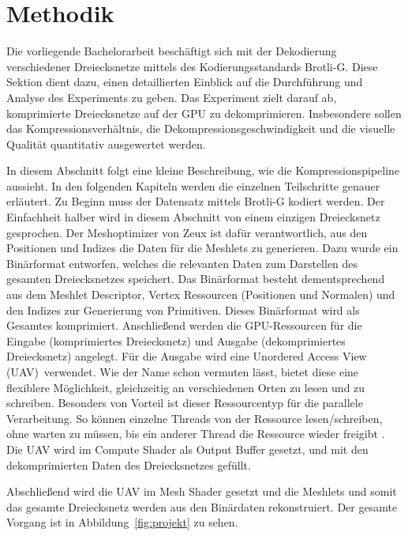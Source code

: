 \section{Methodik}
\label{sec:methodik}
Die vorliegende Bachelorarbeit beschäftigt sich mit der Dekodierung verschiedener Dreiecksnetze mittels des Kodierungsstandards Brotli-G.
Diese Sektion dient dazu, einen detaillierten Einblick auf die Durchführung und Analyse des Experiments zu geben.
Das Experiment zielt darauf ab, komprimierte Dreiecksnetze auf der GPU zu dekomprimieren.
Insbesondere sollen das Kompressionsverhältnis, die Dekompressionsgeschwindigkeit und die visuelle Qualität quantitativ ausgewertet werden. \newline

In diesem Abschnitt folgt eine kleine Beschreibung, wie die Kompressionspipeline aussieht.
In den folgenden Kapiteln werden die einzelnen Teilschritte genauer erläutert. \newline
Zu Beginn muss der Datensatz mittels Brotli-G kodiert werden.
Der Einfachheit halber wird in diesem Abschnitt von einem einzigen Dreiecksnetz gesprochen.
Der Meshoptimizer von Zeux \cite{Zeux} ist dafür verantwortlich, aus den Positionen und Indizes die Daten für die Meshlets zu generieren.
Dazu wurde ein Binärformat entworfen, welches die relevanten Daten zum Darstellen des gesamten Dreiecksnetzes speichert.
Das Binärformat besteht dementsprechend aus dem Meshlet Descriptor, Vertex Ressourcen (Positionen und Normalen) und den Indizes zur Generierung von Primitiven. \newline
Dieses Binärformat wird als Gesamtes komprimiert.
Anschließend werden die GPU-Ressourcen für die Eingabe (komprimiertes Dreiecksnetz) und Ausgabe (dekomprimiertes Dreiecksnetz) angelegt. \newline
Für die Ausgabe wird eine \glqq Unordered Access View (UAV)\grqq\ verwendet.
Wie der Name schon vermuten lässt, bietet diese eine flexiblere Möglichkeit, gleichzeitig an verschiedenen Orten zu lesen und zu schreiben.
Besonders von Vorteil ist dieser Ressourcentyp für die parallele Verarbeitung.
So können einzelne Threads von der Ressource lesen/schreiben, ohne warten zu müssen, bis ein anderer Thread die Ressource wieder freigibt \cite{Microsoft2021}. \newline
Die UAV wird im Compute Shader als Output Buffer gesetzt, und mit den dekomprimierten Daten des Dreiecksnetzes gefüllt.

Abschließend wird die UAV im Mesh Shader gesetzt und die Meshlets und somit das gesamte Dreiecksnetz werden aus den Binärdaten rekonstruiert. \newline
Der gesamte Vorgang ist in Abbildung~\ref{fig:projekt} zu sehen.

